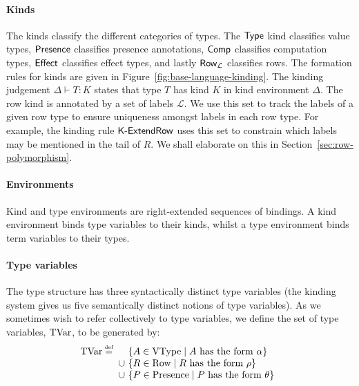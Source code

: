 \documentclass[12pt,phd,lfcs,twoside,openright,logo,leftchapter,normalheadings]{infthesis}
\theoremstyle{plain}
\theoremstyle{definition}
\begin{document}
\paragraph{Kinds}
The kinds classify the different categories of types. The $\mathsf{Type}$ kind
classifies value types, $\mathsf{Presence}$ classifies presence annotations,
$\mathsf{Comp}$ classifies computation types, $\mathsf{Effect}$ classifies effect
types, and lastly $\mathsf{Row}_{\mathcal{L}}$ classifies rows.
%
The formation rules for kinds are given in
Figure~\ref{fig:base-language-kinding}. The kinding judgement
$\Delta \vdash T : K$ states that type $T$ has kind $K$ in kind
environment $\Delta$.
%
The row kind is annotated by a set of labels $\mathcal{L}$. We use
this set to track the labels of a given row type to ensure uniqueness
amongst labels in each row type. For example, the kinding rule
$\mathsf{K\textrm{-}ExtendRow}$ uses this set to constrain which labels may be
mentioned in the tail of $R$. We shall elaborate on this in
Section~\ref{sec:row-polymorphism}.

\paragraph{Environments}
Kind and type environments are right-extended sequences of bindings. A
kind environment binds type variables to their kinds, whilst a type
environment binds term variables to their types.

\paragraph{Type variables} The type structure has three syntactically
distinct type variables (the kinding system gives us five semantically
distinct notions of type variables). As we sometimes wish to refer
collectively to type variables, we define the set of type variables,
$\textrm{TVar}$, to be generated by:
%
\[
  \TyVarCat \defas
  \ba[t]{@{~}l@{~}l}
         &\{ A \in \ValTypeCat  \mid A \text{ has the form } \alpha \}\\
    \cup &\{ R \in \RowCat      \mid R \text{ has the form } \rho   \}\\
    \cup &\{ P \in \PresenceCat \mid P \text{ has the form } \theta \}
  \ea
\]
\end{document}
